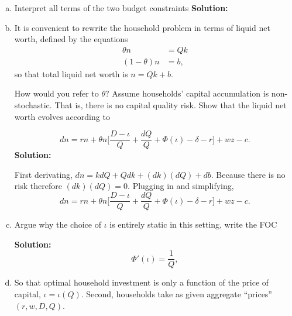 \documentclass[11pt]{extarticle}
\theoremstyle{plain}
\theoremstyle{definition}
\begin{document}
\begin{enumerate}[(a)]
 \item Interpret all terms of the two budget constraints
\textbf{Solution:} 

\item It is convenient to rewrite the household problem in terms of liquid net worth, defined by the equations 
\begin{align*}
	\theta n &= Q k \\
	(1-\theta) n &= b,
\end{align*}
so that total liquid net worth is $n = Qk + b$.

 How would you refer to $\theta$? Assume households' capital accumulation is non-stochastic. That is, there is no capital quality risk. Show that the liquid net worth evolves according to 

\begin{equation*}
	dn = rn +  \theta n \bigg[ \frac{D - \iota }{Q} +  \frac{dQ}{Q} + \Phi(\iota) - \delta - r \bigg]  + w z - c .
\end{equation*}
\textbf{Solution:} 

 First derivating, $dn = k dQ + Q dk + (dk)(dQ) + db$. Because there is no risk therefore $(dk)(dQ) = 0$. Plugging in and simplifying, 
\begin{equation*}
	dn = rn +  \theta n \bigg[ \frac{D - \iota }{Q} +  \frac{dQ}{Q} + \Phi(\iota) - \delta - r \bigg]  + w z - c .
\end{equation*}

\item Argue why the choice of $\iota$ is entirely static in this setting, write the FOC

\textbf{Solution:}
\begin{equation*}
	\Phi'(\iota) = \frac{1}{Q},
\end{equation*}

\item So that optimal household investment is only a function of the price of capital, $\iota = \iota(Q)$. Second, households take as given aggregate ``prices'' $(r, w, D, Q)$. 



\end{enumerate}
\end{document}

